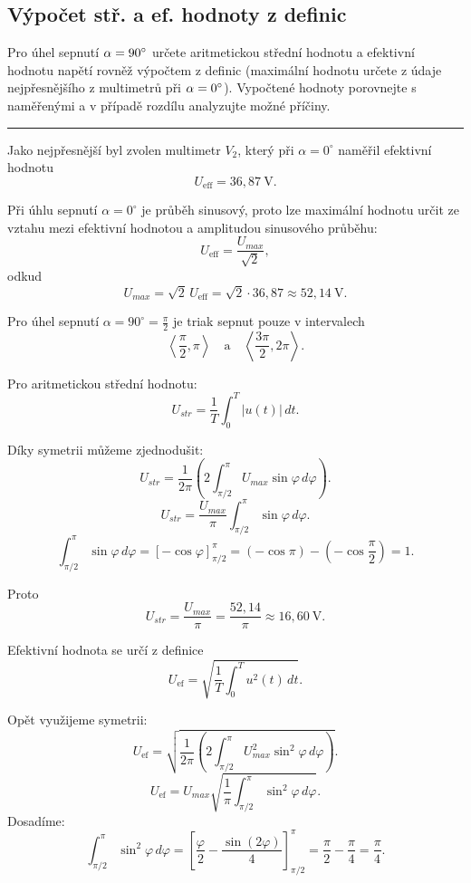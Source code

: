 \documentclass[a4paper,12pt]{article}
\begin{document}
\subsection{Výpočet stř. a ef. hodnoty z definic}
Pro úhel sepnutí $\alpha = 90\degree$ určete aritmetickou střední hodnotu a efektivní hodnotu napětí rovněž výpočtem z definic (maximální hodnotu určete z údaje nejpřesnějšího z multimetrů při $\alpha = 0\degree$).
Vypočtené hodnoty porovnejte s naměřenými a v případě rozdílu analyzujte možné příčiny.
\par\noindent\rule{\textwidth}{0.4pt}
Jako nejpřesnější byl zvolen multimetr $V_2$, který při $\alpha = 0^\circ$ naměřil efektivní hodnotu
$$
U_{\mathrm{eff}} = 36{,}87\ \mathrm{V}.
$$

Při úhlu sepnutí $\alpha = 0^\circ$ je průběh sinusový, proto lze maximální hodnotu určit ze vztahu mezi efektivní hodnotou a amplitudou sinusového průběhu:
$$
U_{\mathrm{eff}} = \frac{U_{max}}{\sqrt{2}},
$$
odkud
$$
U_{max} = \sqrt{2}\,U_{\mathrm{eff}} = \sqrt{2}\cdot 36{,}87 \approx 52{,}14\ \mathrm{V}.
$$

Pro úhel sepnutí $\alpha = 90^\circ = \frac{\pi}{2}$ je triak sepnut pouze v intervalech
$$
\left\langle \frac{\pi}{2}, \pi \right\rangle
\quad \text{a} \quad
\left\langle \frac{3\pi}{2}, 2\pi \right\rangle.
$$

Pro aritmetickou střední hodnotu:
$$
U_{str} = \frac{1}{T}\int_0^T |u(t)|\,dt.
$$

Díky symetrii můžeme zjednodušit:
$$
U_{str} = \frac{1}{2\pi}\left( 2\int_{\pi/2}^{\pi} U_{max}\sin\varphi\,d\varphi \right).
$$
$$
U_{str} = \frac{U_{max}}{\pi}\int_{\pi/2}^{\pi}\sin\varphi\,d\varphi.
$$
$$
\int_{\pi/2}^{\pi}\sin\varphi\,d\varphi
=
[-\cos\varphi]_{\pi/2}^{\pi}
=
(-\cos\pi)-(-\cos\frac{\pi}{2})
= 1.
$$

Proto
$$
U_{str} = \frac{U_{max}}{\pi} = \frac{52{,}14}{\pi} \approx 16{,}60\ \mathrm{V}.
$$

Efektivní hodnota se určí z definice
$$
U_{\mathrm{ef}} = \sqrt{\frac{1}{T}\int_0^T u^2(t)\,dt}.
$$

Opět využijeme symetrii:
$$
U_{\mathrm{ef}} =
\sqrt{
\frac{1}{2\pi}
\left(
2\int_{\pi/2}^{\pi} U_{max}^2\sin^2\varphi\,d\varphi
\right)
}.
$$
$$
U_{\mathrm{ef}} =
U_{max}\sqrt{
\frac{1}{\pi}\int_{\pi/2}^{\pi}\sin^2\varphi\,d\varphi
}.
$$
Dosadíme:
$$
\int_{\pi/2}^{\pi}\sin^2\varphi\,d\varphi
=
\left[\frac{\varphi}{2} - \frac{\sin(2\varphi)}{4}\right]_{\pi/2}^{\pi}
=
\frac{\pi}{2} - \frac{\pi}{4}
=
\frac{\pi}{4}.
$$
\end{document}
